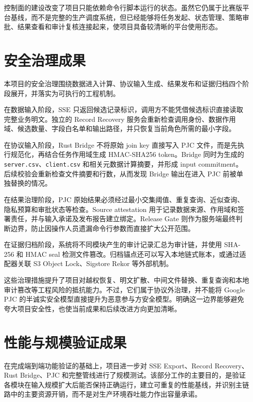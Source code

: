 \documentclass[UTF8,a4paper,12pt,oneside]{ctexrep}
\begin{document}
控制面的建设改变了项目只能依赖命令行脚本运行的状态。虽然它仍属于比赛版平台基线，而不是完整的生产调度系统，但已经能够将任务发起、状态管理、策略审批、结果查看和审计复核连接起来，使项目具备较清晰的平台使用形态。

\section{安全治理成果}

本项目的安全治理围绕数据进入计算、协议输入生成、结果发布和证据归档四个阶段展开，并落实为可执行的工程机制。

在数据输入阶段，SSE 只返回候选记录标识，调用方不能凭借候选标识直接读取完整业务明文。独立的 Record Recovery 服务会重新检查调用身份、数据作用域、候选数量、字段白名单和输出路径，并只恢复当前角色所需的最小字段。

在协议输入阶段，Rust Bridge 不将原始 join key 直接写入 PJC 文件，而是先执行规范化，再结合任务作用域生成 HMAC-SHA256 token。Bridge 同时为生成的 \texttt{server.csv}、\texttt{client.csv} 和相关元数据计算摘要，并形成 input commitment。后续校验会重新检查文件摘要和行数，从而发现 Bridge 输出在进入 PJC 前被单独替换的情况。

在结果治理阶段，PJC 原始结果必须经过最小交集阈值、重复查询、近似查询、隐私预算和审批状态等检查。Source attestation 用于记录数据来源、作用域和签署责任，并与输入承诺及发布报告建立绑定。Release Gate 则作为服务端最终判断边界，防止因操作人员遗漏命令行参数而直接扩大公开范围。

在证据归档阶段，系统将不同模块产生的审计记录汇总为审计链，并使用 SHA-256 和 HMAC seal 检测文件篡改。归档锚点还可以写入本地链式账本，或通过适配器关联 S3 Object Lock、Sigstore Rekor 等外部机制。

这些治理措施提升了项目对越权恢复、明文扩散、中间文件替换、重复查询和本地审计篡改等工程风险的抵抗能力。不过，它们属于协议外治理，并不能将 Google PJC 的半诚实安全模型直接提升为恶意参与方安全模型。明确这一边界能够避免夸大项目安全性，也使当前成果和后续改进方向更加清晰。


\section{性能与规模验证成果}

在完成端到端功能验证的基础上，项目进一步对 SSE Export、Record Recovery、Rust Bridge、PJC 和完整管线进行了规模测试。该部分工作的主要目的，是验证各模块在输入规模扩大后能否保持正确运行，建立可重复的性能基线，并识别主链路中的主要资源开销，而不是对生产环境吞吐能力作出容量承诺。
\end{document}
